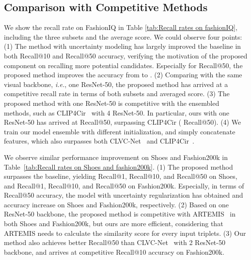 \documentclass[10pt,twocolumn,letterpaper]{article}
\def\ie{\emph{i.e.}}
\begin{document}
\subsection{Comparison with Competitive Methods}
We show the recall rate on FashionIQ in Table \ref{tab:Recall rates on fashionIQ}, including the three subsets and the average score. 
We could observe four points: (1) The method with uncertainty modeling has largely improved the baseline in both Recall@10 and Recall@50 accuracy, verifying the motivation of the proposed component on recalling more potential candidates. 
Especially for Recall@50, the proposed method improves the accuracy from  to .
(2) Comparing with the same visual backbone, \ie, one ResNet-50, the proposed method has arrived at a competitive recall rate in terms of both subsets and averaged score. (3) The proposed method with one ResNet-50 is competitive with the ensembled methods, such as CLIP4Cir~\cite{CLIP4Cir} with 4 ResNet-50. 
In particular, ours with one ResNet-50 has arrived at  Recall@50, surpassing CLIP4Cir ( Recall@50). 
(4) We train our model ensemble with different initialization, and simply concatenate features, which also surpasses both CLVC-Net~\cite{CLVC-Net} and CLIP4Cir~\cite{CLIP4Cir}. 





We observe similar performance improvement on Shoes and Fashion200k in Table~\ref{tab:Recall rates on Shoes and fashion200k}. (1) The proposed method surpasses the baseline, yielding  Recall@1,  Recall@10, and  Recall@50 on Shoes, and  Recall@1,  Recall@10, and  Recall@50 on Fashion200k. Especially, in terms of Recall@50 accuracy, the model with uncertainty regularization has obtained  and  accuracy increase on Shoes and Fashion200k, respectively. 
(2) Based on one ResNet-50 backbone, the proposed method is competitive with ARTEMIS~\cite{delmas2022artemis} in both Shoes and Fashion200k, but ours are more efficient, considering that ARTEMIS needs to calculate the similarity score for every input triplets. 
(3) Our method also achieves better Recall@50  than CLVC-Net~\cite{CLVC-Net}  with 2 ResNet-50 backbone, and arrives at competitive Recall@10 accuracy on Fashion200k.  
\end{document}
